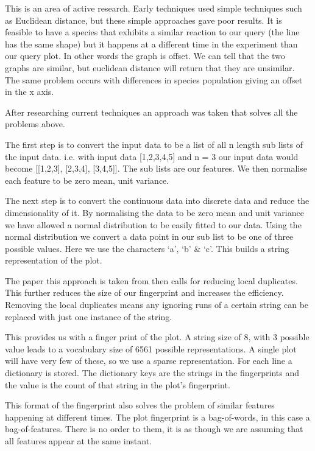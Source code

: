 This is an area of active research.  Early techniques used simple techniques such as Euclidean distance, but these simple approaches gave poor results.  It is feasible to have a species that exhibits a similar reaction to our query (the line has the same shape) but it happens at a different time in the experiment than our query plot.  In other words the graph is offset.  We can tell that the two graphs are similar, but euclidean distance will return that they are unsimilar.  The same problem occurs with differences in species population giving an offset in the x axis.

After researching current techniques an approach was taken that solves all the problems above.

The first step is to convert the input data to be a list of all n length sub lists of the input data. i.e. with input data [1,2,3,4,5] and n = 3 our input data would become [[1,2,3], [2,3,4], [3,4,5]].  The sub lists are our features.  We then normalise each feature to be zero mean, unit variance.

The next step is to convert the continuous data into discrete data and reduce the dimensionality of it.  By normalising the data to be zero mean and unit variance we have allowed a normal distribution to be easily fitted to our data.   Using the normal distribution we convert a data point in our sub list to be one of three possible values.  Here we use the characters `a', `b' \& `c'.  This builds a string representation of the plot.

The paper this approach is taken from then calls for reducing local duplicates.  This further reduces the size of our fingerprint and increases the efficiency.  Removing the local duplicates means any ignoring runs of a certain string can be replaced with just one instance of the string.

This provides us with a finger print of the plot.  A string size of 8, with 3 possible value leads to a vocabulary size of 6561 possible representations.  A single plot will have very few of these, so we use a sparse representation.  For each line a dictionary is stored.  The dictionary keys are the strings in the fingerprints and the value is the count of that string in the plot's fingerprint.

This format of the fingerprint also solves the problem of similar features happening at different times.  The plot fingerprint is a bag-of-words, in this case a bag-of-features.  There is no order to them, it is as though we are assuming that all features appear at the same instant.

